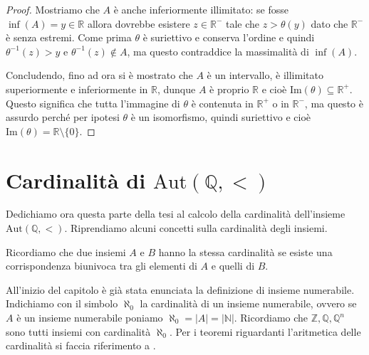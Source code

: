 \documentclass[12pt,a4paper,openright]{report}
\newcommand{\aut}{ \mathrm{Aut} ( \mathbb{Q},< ) } %
\newcommand{\N}{\mathbb{N}} %
\newcommand{\Z}{\mathbb{Z}} %
\newcommand{\Q}{\mathbb{Q}} %
\newcommand{\R}{\mathbb{R}} %
\newcommand{\0}{\setminus\{0\}} %
\theoremstyle{definition}
\theoremstyle{plain}
\begin{document}
\begin{proof}
    Mostriamo che $A$ è anche inferiormente illimitato: se fosse $\inf (A)=y \in \R$ allora dovrebbe esistere $z \in \R^-$ tale che $z> \theta(y)$ dato che $\R^-$ è senza estremi. 
    Come prima $\theta$ è suriettivo e conserva l'ordine e quindi $\theta^{-1}(z)>y$ e $\theta^{-1}(z) \notin A$, ma questo contraddice la massimalità di $\inf(A)$.

    Concludendo, fino ad ora si è mostrato che $A$ è un intervallo, è illimitato superiormente e inferiormente in $\R$, dunque $A$ è proprio $\R$ e cioè $\mathrm{Im}(\theta) \subseteq \R^+$. Questo significa che tutta l'immagine di $\theta$ è contenuta in $\R^+$ o in $\R^-$, ma questo è assurdo perché per ipotesi $\theta$ è un isomorfismo, quindi suriettivo e cioè $\mathrm{Im}(\theta)=\R\0$. 
\end{proof}


\section{Cardinalità di $\aut$}
Dedichiamo ora questa parte della tesi al calcolo della cardinalità dell'insieme $\aut$. Riprendiamo alcuni concetti sulla cardinalità degli insiemi. 

Ricordiamo che due insiemi $A$ e $B$ hanno la stessa cardinalità se esiste una corrispondenza biunivoca tra gli elementi di $A$ e quelli di $B$.

All'inizio del capitolo è già stata enunciata la definizione di insieme numerabile. Indichiamo con il simbolo $\aleph_0$ la cardinalità di un insieme numerabile, ovvero se $A$ è un insieme numerabile poniamo $\aleph_0=|A|=|\N|$. Ricordiamo che $\Z,\Q,\Q^n$ sono tutti insiemi con cardinalità $\aleph_0$. Per i teoremi riguardanti l'aritmetica delle cardinalità si faccia riferimento a \cite{hunger}.
\end{document}
